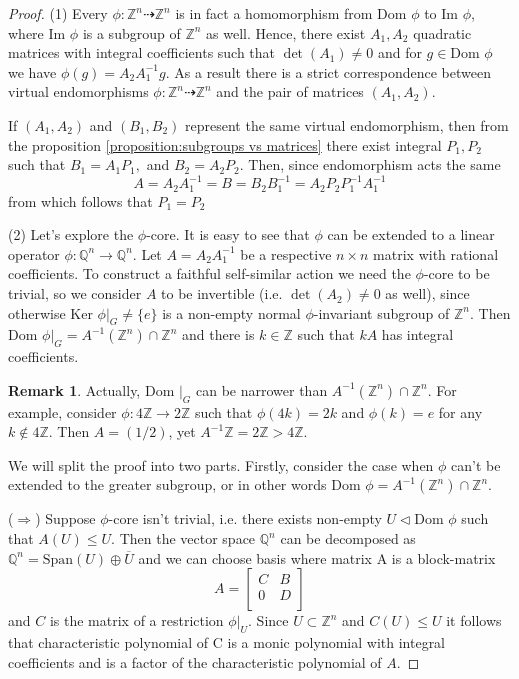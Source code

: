 \documentclass[a4paper,12pt]{amsart}
\theoremstyle{definition}
\newtheorem{remark}{Remark}
\newcommand{\Dom}{\text{Dom }}
\newcommand{\Ker}{\text{Ker }}
\newcommand{\Imag}{\text{Im }}
\begin{document}
	\begin{proof}
	
	
		(1) Every $\phi : \mathbb{Z}^n \dashrightarrow \mathbb{Z}^n$ is in fact a homomorphism from $\Dom \phi $ to $ \Imag \phi$, where $\Imag \phi$ is a subgroup of $\mathbb{Z}^n$ as well. Hence, there exist $A_1, A_2$ quadratic matrices with integral coefficients such that $\det(A_1) \ne 0$ and for $g \in \Dom \phi$ we have $\phi(g) = A_2 A^{-1}_1 g$. As a result there is a strict correspondence between virtual endomorphisms $\phi : \mathbb{Z}^n \dashrightarrow \mathbb{Z}^n$ and the pair of matrices $(A_1, A_2)$. 
		
		If $(A_1, A_2)$ and $(B_1, B_2)$ represent the same virtual endomorphism, then from the proposition \ref{proposition:subgroups vs matrices} there exist integral $P_1, P_2$ such that $B_1 = A_1P_1,$ and $ B_2 = A_2P_2$. Then, since endomorphism acts the same 
		$$
		A = A_2 A_1^{-1} = B = B_2 B_1^{-1} = A_2P_2 P_1^{-1} A_1^{-1}
		$$
		from which follows that $P_1 = P_2$
		
		(2) Let's explore the $\phi$-core. It is easy to see that $\phi$ can be extended to a linear operator $\phi: \mathbb{Q}^n \rightarrow \mathbb{Q}^n$. Let $A = A_2 A_1^{-1}$ be a respective $n\times n$ matrix with rational coefficients. To construct a faithful self-similar action we need the $\phi$-core to be trivial, so we consider $A$ to be invertible (i.e. $\det(A_2) \ne 0$ as well), since otherwise $\Ker \phi|_G \neq \{e\}$ is a non-empty normal $\phi$-invariant subgroup of $\mathbb{Z}^n$. Then $\Dom \phi|_{G} = A^{-1}( \mathbb{Z}^n) \cap \mathbb{Z}^n$ and there is $k \in \mathbb{Z}$ such that $kA$ has integral coefficients.
		
		\begin{remark}
			Actually, $\Dom|_G$ can be narrower than $A^{-1}(\mathbb{Z}^n) \cap \mathbb{Z}^n$. For example, consider $\phi : 4 \mathbb{Z} \rightarrow 2\mathbb{Z}$ such that $\phi(4k) = 2k$ and $\phi(k) = e$ for any $k \notin 4\mathbb{Z}$. Then $A = (1/2)$, yet $A^{-1} \mathbb{Z} = 2\mathbb{Z} > 4\mathbb{Z}$. 
		\end{remark}
		
		
		
		We will split the proof into two parts. Firstly, consider the case when $\phi$ can't be extended to the greater subgroup, or in other words $\Dom \phi = A^{-1} (\mathbb{Z}^n) \cap \mathbb{Z}^n$.  
		 
		($\Rightarrow$) Suppose $\phi$-core isn't trivial, i.e. there exists non-empty $U \lhd \Dom \phi$ such that $A(U) \le U$. Then the vector space $\mathbb{Q}^n$ can be decomposed as $\mathbb{Q}^n = \text{Span}(U) \oplus \overline{U}$ and we can choose basis where matrix A is a block-matrix 
		$$ 
		A = 		
		\begin{bmatrix}
			C & B \\
			0 & D \\
		\end{bmatrix}
		$$
		and $C$ is the matrix of a restriction $\phi|_U$. Since $U \subset \mathbb{Z}^n$ and $C(U) \le U$ it follows that characteristic polynomial of C is a monic polynomial with integral coefficients and is a factor of the characteristic polynomial of $A$.
		

\end{proof}
\end{document}
